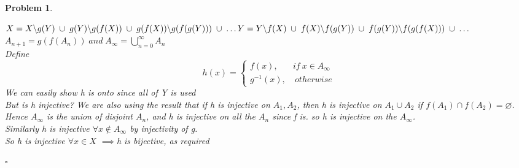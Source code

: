 \documentclass[a4paper]{article}
\newtheorem{prob}{\large{\large{Problem}}}
\newenvironment{sol}{\noindent{\large{\bf Solution:}}}{\hfill\ensuremath{\square}}
\def\imp{\ensuremath{\implies}}
\def\nl{\newline}
\def\bs{\backslash}
\def\ns{\varnothing}
\begin{document}
\begin{prob}
\begin{sol}
{\begin{center}
\end{center}
$X=X\bs g(Y)\;\cup\; g(Y)\bs g(f(X))\;\cup\; g(f(X))\bs g(f(g(Y)))\;\cup\; \dots \\
Y=Y\bs f(X)\;\cup\; f(X)\bs f(g(Y))\; \cup\; f(g(Y))\bs f(g(f(X)))\;\cup\;\dots$\\
$A_{n+1}=g(f(A_n))\; and\; A_\infty =\bigcup\limits_{n=0}^\infty A_n$\\
Define $$
h(x)=
\begin{cases}
f(x), & if \ x \in A_\infty\\
g^{-1}(x), & \ otherwise
\end{cases}
$$
We can easily show h is onto since all of Y is used\\
But is h injective?
\nl We are also using the result that if h is injective on $A_1,A_2$, then h is injective on $A_1 \cup A_2$ if $f(A_1)\cap f(A_2)=\ns$.\\
Hence $A_\infty$ is the union of disjoint $A_n$, and h is injective on all the $A_n$ since f is. so h is injective on the $A_\infty$.\\
Similarly h is injective $\forall x \notin A_\infty$ by injectivity of g.\\
So h is injective $\forall x\in X$
\nl \imp h is bijective, as required
}
\end{sol}
\end{prob}
\end{document}
